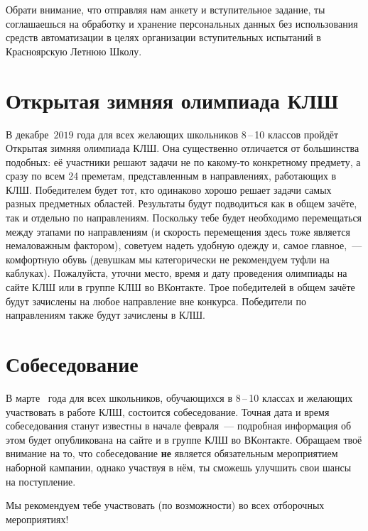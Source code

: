 Обрати внимание, что отправляя нам анкету и вступительное задание, ты соглашаешься на обработку и хранение персональных данных {без использования средств автоматизации} в целях организации вступительных испытаний в Красноярскую Летнюю Школу. 

\section*{Открытая зимняя олимпиада КЛШ}
В декабре~$2019$ года для всех желающих школьников 8\,–\,10 классов пройдёт Открытая зимняя олимпиада КЛШ. Она существенно отличается от большинства подобных: её участники решают задачи не по какому-то конкретному предмету, а сразу по всем 24 преметам, представленным в направлениях, работающих в КЛШ. Победителем будет тот, кто одинаково хорошо решает задачи самых разных предметных областей.
Результаты будут подводиться как в общем зачёте, так и отдельно по направлениям. Поскольку тебе будет необходимо перемещаться между этапами по направлениям (и скорость перемещения здесь тоже является немаловажным фактором), советуем надеть удобную одежду и, самое главное,~— комфортную обувь (девушкам мы категорически не рекомендуем туфли на каблуках). Пожалуйста, уточни место, время и дату проведения олимпиады на сайте КЛШ или в группе КЛШ во ВКонтакте. Трое победителей в общем зачёте будут зачислены на любое направление вне конкурса. Победители по направлениям также будут зачислены в КЛШ. 

\section*{Собеседование}
В марте~\theyear{} года для всех школьников, обучающихся в 8\,–\,10 классах и желающих участвовать в работе КЛШ, состоится собеседование. Точная дата и время собеседования станут известны в начале февраля~— подробная информация об этом будет опубликована на сайте и в группе КЛШ во ВКонтакте. Обращаем твоё внимание на то, что собеседование \textbf{не} является обязательным мероприятием наборной кампании, однако участвуя в нём, ты сможешь улучшить свои шансы на поступление. 

Мы рекомендуем тебе участвовать (по возможности) во всех отборочных мероприятиях!

